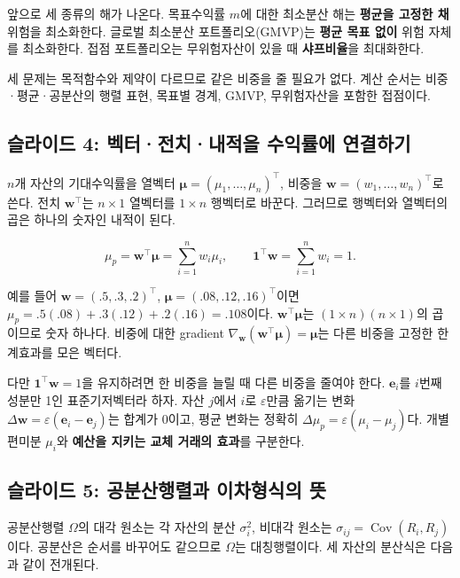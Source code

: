 \documentclass[11pt,a4paper]{article}
\begin{document}
앞으로 세 종류의 해가 나온다. 목표수익률 $m$에 대한 최소분산 해는 \textbf{평균을 고정한 채} 위험을 최소화한다. 글로벌 최소분산 포트폴리오(GMVP)는 \textbf{평균 목표 없이} 위험 자체를 최소화한다. 접점 포트폴리오는 무위험자산이 있을 때 \textbf{샤프비율}을 최대화한다.
\par

세 문제는 목적함수와 제약이 다르므로 같은 비중을 줄 필요가 없다. 계산 순서는 비중·평균·공분산의 행렬 표현, 목표별 경계, GMVP, 무위험자산을 포함한 접점이다.
\par

\subsection{슬라이드 4: 벡터·전치·내적을 수익률에 연결하기}

$n$개 자산의 기대수익률을 열벡터 $\boldsymbol\mu=(\mu_1,\ldots,\mu_n)^\top$, 비중을 $\mathbf w=(w_1,\ldots,w_n)^\top$로 쓴다. 전치 $\mathbf w^\top$는 $n\times1$ 열벡터를 $1\times n$ 행벡터로 바꾼다. 그러므로 행벡터와 열벡터의 곱은 하나의 숫자인 내적이 된다.
\par

\[
\mu_p=\mathbf w^\top\boldsymbol\mu=\sum_{i=1}^n w_i\mu_i,\qquad
\mathbf 1^\top\mathbf w=\sum_{i=1}^n w_i=1.
\]

예를 들어 $\mathbf w=(.5,.3,.2)^\top$, $\boldsymbol\mu=(.08,.12,.16)^\top$이면 $\mu_p=.5(.08)+.3(.12)+.2(.16)=.108$이다. $\mathbf w^\top\boldsymbol\mu$는 $(1\times n)(n\times1)$의 곱이므로 숫자 하나다. 비중에 대한 gradient $\nabla_{\mathbf w}(\mathbf w^\top\boldsymbol\mu)=\boldsymbol\mu$는 다른 비중을 고정한 한계효과를 모은 벡터다.
\par

다만 $\mathbf1^\top\mathbf w=1$을 유지하려면 한 비중을 늘릴 때 다른 비중을 줄여야 한다. $\mathbf e_i$를 $i$번째 성분만 1인 표준기저벡터라 하자. 자산 $j$에서 $i$로 $\varepsilon$만큼 옮기는 변화 $\Delta\mathbf w=\varepsilon(\mathbf e_i-\mathbf e_j)$는 합계가 0이고, 평균 변화는 정확히 $\Delta\mu_p=\varepsilon(\mu_i-\mu_j)$다. 개별 편미분 $\mu_i$와 \textbf{예산을 지키는 교체 거래의 효과}를 구분한다.
\par

\subsection{슬라이드 5: 공분산행렬과 이차형식의 뜻}

공분산행렬 $\Omega$의 대각 원소는 각 자산의 분산 $\sigma_i^2$, 비대각 원소는 $\sigma_{ij}=\operatorname{Cov}(R_i,R_j)$이다. 공분산은 순서를 바꾸어도 같으므로 $\Omega$는 대칭행렬이다. 세 자산의 분산식은 다음과 같이 전개된다.
\par
\end{document}
